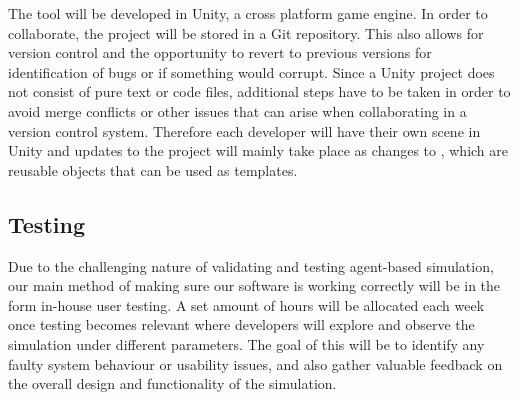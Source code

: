The tool will be developed in Unity, a cross platform game engine. In order to collaborate, the project will be stored in a Git repository. This also allows for version control and the opportunity to revert to previous versions for identification of bugs or if something would corrupt. Since a Unity project does not consist of pure text or code files, additional steps have to be taken in order to avoid merge conflicts or other issues that can arise when collaborating in a version control system. Therefore each developer will have their own scene in Unity and updates to the project will mainly take place as changes to , which are reusable objects that can be used as templates.

\subsection{Testing}
Due to the challenging nature of validating and testing agent-based simulation, our main method of making sure our software is working correctly will be in the form in-house user testing. A set amount of hours will be allocated each week once testing becomes relevant where developers will explore and observe the simulation under different parameters. The goal of this will be to identify any faulty system behaviour or usability issues, and also gather valuable feedback on the overall design and functionality of the simulation. 
